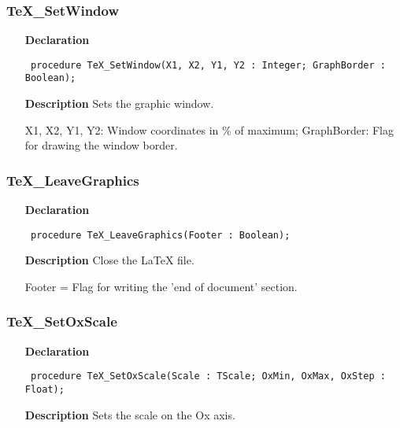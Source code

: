 \documentclass[12pt,a4paper,oneside]{report}
\newcommand{\declarationitem}[1]{\textbf{#1}}
\newcommand{\descriptiontitle}[1]{\textbf{#1}}
\newcommand{\code}[1]{\texttt{#1}}
\begin{document}
\subsubsection{TeX{\_}SetWindow}
\label{utexplot-TeX_SetWindow}
\begin{itemize}\item[\declarationitem{Declaration}\hfill]
	\begin{flushleft}
		\code{
			procedure TeX{\_}SetWindow(X1, X2, Y1, Y2 : Integer; GraphBorder : Boolean);}
		
	\end{flushleft}
	
	\par
	\item[\descriptiontitle{Description}]
	Sets the graphic window.
	
	X1, X2, Y1, Y2: Window coordinates in {\%} of maximum; GraphBorder: Flag for drawing the window border.
	
\end{itemize}
\subsubsection{TeX{\_}LeaveGraphics}
\label{utexplot-TeX_LeaveGraphics}
\begin{itemize}\item[\declarationitem{Declaration}\hfill]
	\begin{flushleft}
		\code{
			procedure TeX{\_}LeaveGraphics(Footer : Boolean);}
		
	\end{flushleft}
	
	\par
	\item[\descriptiontitle{Description}]
	Close the LaTeX file.
	
	Footer = Flag for writing the 'end of document' section.
	
\end{itemize}
\subsubsection{TeX{\_}SetOxScale}
\label{utexplot-TeX_SetOxScale}
\begin{itemize}\item[\declarationitem{Declaration}\hfill]
	\begin{flushleft}
		\code{
			procedure TeX{\_}SetOxScale(Scale : TScale; OxMin, OxMax, OxStep : Float);}
		
	\end{flushleft}
	
	\par
	\item[\descriptiontitle{Description}]
	Sets the scale on the Ox axis.
	
\end{itemize}
\end{document}
